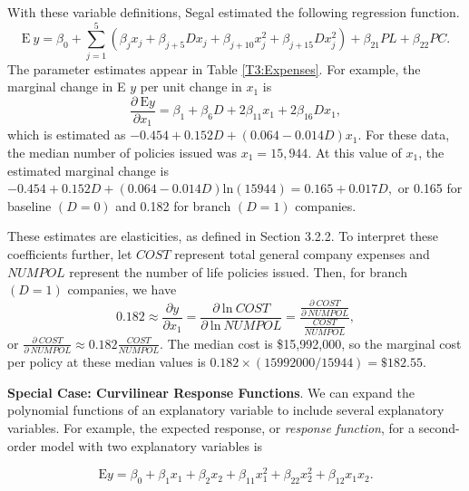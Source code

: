 With these variable definitions, Segal estimated the following
regression function.
\begin{equation*}
\mathrm{E~}y=\beta_0 + \sum_{j=1}^5 \left( \beta_j x_j + \beta_{j+5}
D x_j + \beta_{j+10} x_j^2 + \beta_{j+15}D x_j^2  \right) +
\beta_{21} PL + \beta_{22} PC.
\end{equation*}
The parameter estimates appear in Table \ref{T3:Expenses}. For
example, the marginal change in E $y$ per unit change in $x_1$ is
\begin{equation*}
\frac{\partial ~ \mathrm{E}y}{\partial x_1}= \beta_1 + \beta_{6} D +
2 \beta_{11} x_1 + 2 \beta_{16}D x_1,
\end{equation*}
which is estimated as $ -0.454 + 0.152 D + (0.064 - 0.014 D) x_1$.
For these data, the median number of policies issued was
$x_1=15,944$. At this value of $x_1$, the estimated marginal change
is $ -0.454 + 0.152 D + (0.064 - 0.014 D) \mathrm{ln}(15944) = 0.165
+ 0.017 D,$ or 0.165 for baseline $(D=0)$ and 0.182 for branch
$(D=1)$ companies.

These estimates are elasticities, as defined in Section 3.2.2. To
interpret these coefficients further, let $COST$ represent total
general company expenses and $NUMPOL$ represent the number of life
policies issued. Then, for branch $(D=1)$ companies, we have
\begin{equation*}
0.182 \approx \frac{\partial y }{\partial x_1 } = \frac{\partial ~
\mathrm{ln}~COST}{\partial ~ \mathrm{ln}~NUMPOL}= \frac{
\frac{\partial ~ COST}{\partial ~NUMPOL}} {\frac{COST}{NUMPOL}},
\end{equation*}
or $\frac{\partial ~ COST}{\partial ~NUMPOL} \approx 0.182
\frac{COST}{NUMPOL}$. The median cost is \$15,992,000, so the
marginal cost per policy at these median values is $ 0.182 \times
(15992000/15944) = \$182.55$.

\linejed


\bigskip

\textbf{Special Case: Curvilinear Response Functions}. We can expand
the polynomial functions of an explanatory variable to include
several explanatory variables. For example, the expected response,
or \emph{response function}, for a second-order model with two
explanatory variables is

\begin{equation*}
\textrm{E} y = \beta_0 + \beta_1 x_1 + \beta_2 x_2 + \beta_{11}
x_1^2 + \beta_{22} x_2^2 + \beta_{12} x_1 x_2.
\end{equation*}


